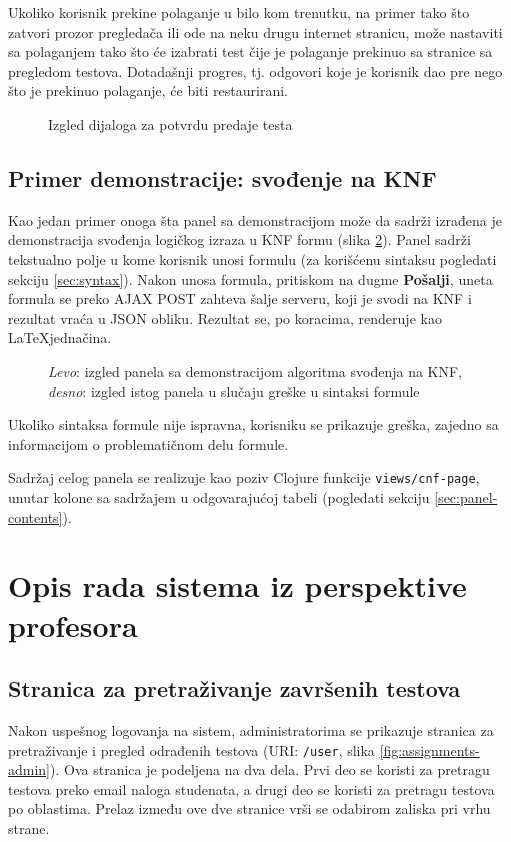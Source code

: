 Ukoliko korisnik prekine polaganje u bilo kom trenutku, na primer tako što zatvori prozor pregledača ili ode na neku drugu internet stranicu, može nastaviti sa polaganjem tako što će izabrati test čije je polaganje prekinuo sa stranice sa pregledom testova. Dotadašnji progres, tj. odgovori koje je korisnik dao pre nego što je prekinuo polaganje, će biti restaurirani.
\begin{figure}[h]
\centering
{}
\caption{Izgled dijaloga za potvrdu predaje testa}
\label{fig:task-submit}
\end{figure}

\subsection{Primer demonstracije: svođenje na KNF}
Kao jedan primer onoga šta panel sa demonstracijom može da sadrži izrađena je demonstracija svođenja logičkog izraza u KNF formu (slika \ref{fig:cnf}). Panel sadrži tekstualno polje u kome korisnik unosi formulu (za korišćenu sintaksu pogledati sekciju \ref{sec:syntax}). Nakon unosa formula, pritiskom na dugme \textbf{Pošalji}, uneta formula se preko AJAX POST zahteva šalje serveru, koji je svodi na KNF i rezultat vraća u JSON obliku. Rezultat se, po koracima, renderuje kao \LaTeX \space jednačina.
\begin{figure}[h]
\centering
{}
\caption{\textit{Levo}: izgled panela sa demonstracijom algoritma svođenja na KNF, \textit{desno}: izgled istog panela u slučaju greške u sintaksi formule}
\label{fig:cnf}
\end{figure}
Ukoliko sintaksa formule nije ispravna, korisniku se prikazuje greška, zajedno sa informacijom o problematičnom delu formule.

Sadržaj celog panela se realizuje kao poziv Clojure funkcije \texttt{views/cnf-page}, unutar kolone sa sadržajem u odgovarajućoj tabeli (pogledati sekciju \ref{sec:panel-contents}).

\section{Opis rada sistema iz perspektive profesora}
\subsection{Stranica za pretraživanje završenih testova}
Nakon uspešnog logovanja na sistem, administratorima se prikazuje stranica za pretraživanje i pregled odrađenih testova (URI: \texttt{/user}, slika \ref{fig:assignments-admin}). Ova stranica je podeljena na dva dela. Prvi deo se koristi za pretragu testova preko email naloga studenata, a drugi deo se koristi za pretragu testova po oblastima. Prelaz između ove dve stranice vrši se odabirom zaliska pri vrhu strane.

